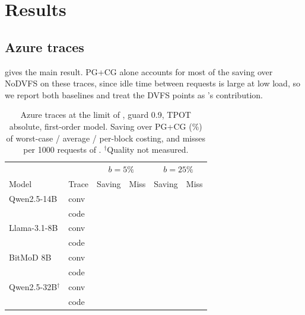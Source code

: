 \section{Results}
\label{sec:results}

\subsection{Azure traces}
 gives the main result.
PG+CG alone accounts for most of the saving over NoDVFS on these traces, since idle time between requests is large at low load, so we report both baselines and treat the DVFS points as \sys{}'s contribution.

\begin{table}[t]
\centering
\caption{Azure traces at the limit of , guard 0.9, TPOT absolute, first-order model. Saving over PG+CG (\%) of worst-case / average / per-block costing, and misses per 1000 requests of \sys{}. $^\dagger$Quality not measured.}
\label{tab:real}
\small
\setlength{\tabcolsep}{3pt}
\begin{tabular}{@{}llcccc@{}}
\toprule
 & & \multicolumn{2}{c}{$b=5\%$} & \multicolumn{2}{c}{$b=25\%$} \\
Model & Trace & Saving & Miss & Saving & Miss \\
\midrule
Qwen2.5-14B & conv & \TBD{} & \TBD{} & \TBD{} & \TBD{} \\
 & code & \TBD{} & \TBD{} & \TBD{} & \TBD{} \\
Llama-3.1-8B & conv & \TBD{} & \TBD{} & \TBD{} & \TBD{} \\
 & code & \TBD{} & \TBD{} & \TBD{} & \TBD{} \\
BitMoD 8B & conv & \TBD{} & \TBD{} & \TBD{} & \TBD{} \\
 & code & \TBD{} & \TBD{} & \TBD{} & \TBD{} \\
Qwen2.5-32B$^\dagger$ & conv & \TBD{} & \TBD{} & \TBD{} & \TBD{} \\
 & code & \TBD{} & \TBD{} & \TBD{} & \TBD{} \\
\bottomrule
\end{tabular}
\end{table}

